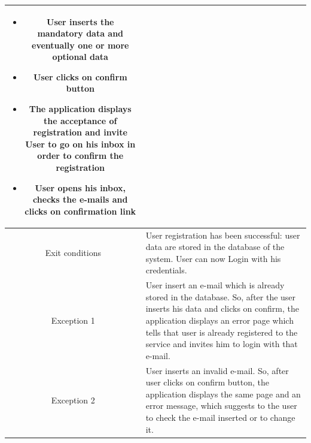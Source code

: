 \documentclass[table, 12pt]{article}
\begin{document}
\begin{minipage}{\textwidth}
\begin{longtable}{ | c | p{10cm} | }
\begin{itemize}[nosep,after=\strut]
            \item User inserts the mandatory data and eventually one or more optional data
            \item User clicks on confirm button
            \item The application displays the acceptance of registration and invite User to go on his inbox in order to confirm the registration
            \item User opens his inbox, checks the e-mails and clicks on confirmation link
        \end{itemize}                                                                                                                                                                                                                                             \\
        \hline
        Exit conditions  & User registration has been successful: user data are stored in the database of the system. User can now Login with his credentials.                                                                                                                                    \\
        \hline
        \hline
        Exception 1      & User insert an e-mail which is already stored in the database. So, after the user inserts his data and clicks on confirm, the application displays an error page which tells that user is already registered to the service and invites him to login with that e-mail. \\
        \hline
        Exception 2      & User inserts an invalid e-mail. So, after user clicks on confirm button, the application displays the same page and an error message, which suggests to the user to check the e-mail inserted or to change it.                                                         \\
        \hline
    \end{longtable}
\end{minipage}
\end{document}
